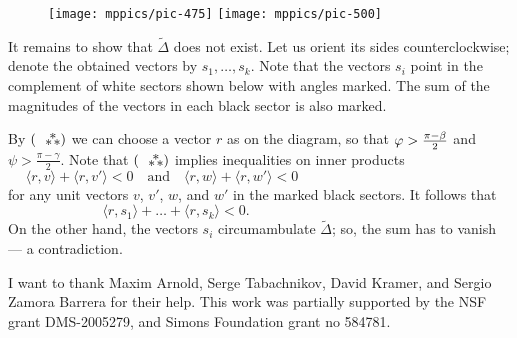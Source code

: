 \documentclass[oneside,a4paper]{amsart}
\begin{document}
\begin{figure}
\vskip-6mm
\centering
\texttt{[image: mppics/pic-475]}
\bigskip
\texttt{[image: mppics/pic-500]}
\vskip7mm
\end{figure}

It remains to show that $\tilde\Delta$ does not exist.
Let us orient its sides counterclockwise;
denote the obtained vectors by $s_1,\dots,s_k$.
Note that the vectors $s_i$ point in the complement of white sectors shown below with angles marked.
The sum of the magnitudes of the vectors in each black sector is also marked.

By $(\asterism)$ we can choose a vector $r$ as on the diagram, so that $\phi\z>\tfrac{\pi-\beta}2$ and $\psi>\tfrac{\pi-\gamma}2$.
Note that $(\asterism)$ implies inequalities on inner products
\[\langle r,v\rangle+\langle r,v'\rangle<0\quad\text{and}\quad \langle r,w\rangle+\langle r,w'\rangle<0\qquad\qquad\qquad\qquad\qquad\qquad\qquad\]
for any unit vectors $v$, $v'$, $w$, and $w'$ in the marked black sectors.
It follows that 
\[
\langle r,s_1\rangle+\dots+\langle r,s_k\rangle<0.\qquad\qquad\qquad\qquad\qquad\qquad
\]
On the other hand, the vectors $s_i$ circumambulate $\tilde\Delta$;
so, the sum has to vanish
--- a contradiction.

{\small {}
I want to thank Maxim Arnold, Serge Tabachnikov, David Kramer, and Sergio Zamora Barrera for their help.
This work was partially supported by the NSF grant DMS-2005279, and Simons Foundation grant no 584781.}



{\sloppy
\printbibliography
\fussy
}
\end{document}
